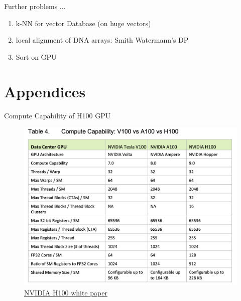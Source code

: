 \documentclass[dvipdfmx, 11pt, aspectratio=169]{beamer}   %
\begin{document}
\begin{frame}{Further problems ...}
  \begin{enumerate}
    \item k-NN for vector Database (on huge vectors)
    \item local alignment of DNA arrays: Smith Watermann's DP
    \item Sort on GPU
  \end{enumerate}
\end{frame}
\section{Appendices}
\begin{frame}{Compute Capability of H100 GPU}
  \begin{figure}
    \includegraphics[scale=0.3]{img/computeCapability.png}
    \caption{\href{https://www.advancedclustering.com/wp-content/uploads/2022/03/gtc22-whitepaper-hopper.pdf}{NVIDIA H100 white paper}}
  \end{figure}
\end{frame}
\end{document}
